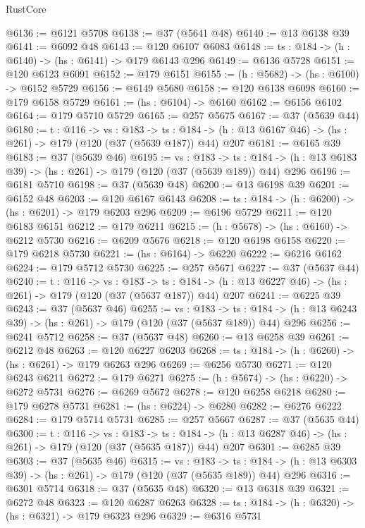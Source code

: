 \begin{lexlean}{RustCore}
\begin{coremodule}
@6136 := @6121 @5708
@6138 := @37 (@5641 @48)
@6140 := @13 @6138 @39
@6141 := @6092 @48
@6143 := @120 @6107 @6083
@6148 := {ts : @184} -> (h : @6140) -> (hs : @6141) -> @179 @6143 @296
@6149 := @6136 @5728
@6151 := @120 @6123 @6091
@6152 := @179 @6151
@6155 := (h : @5682) -> (hs : @6100) -> @6152 @5729
@6156 := @6149 @5680
@6158 := @120 @6138 @6098
@6160 := @179 @6158 @5729
@6161 := (hs : @6104) -> @6160
@6162 := @6156 @6102
@6164 := @179 @5710 @5729
@6165 := @257 @5675
@6167 := @37 (@5639 @44)
@6180 := {t : @116} ->
  {vs : @183} ->
  {ts : @184} -> (h : @13 @6167 @46) -> (hs : @261) -> @179 (@120 (@37 (@5639 @187)) @44) @207
@6181 := @6165 @39
@6183 := @37 (@5639 @46)
@6195 := {vs : @183} ->
  {ts : @184} -> (h : @13 @6183 @39) -> (hs : @261) -> @179 (@120 (@37 (@5639 @189)) @44) @296
@6196 := @6181 @5710
@6198 := @37 (@5639 @48)
@6200 := @13 @6198 @39
@6201 := @6152 @48
@6203 := @120 @6167 @6143
@6208 := {ts : @184} -> (h : @6200) -> (hs : @6201) -> @179 @6203 @296
@6209 := @6196 @5729
@6211 := @120 @6183 @6151
@6212 := @179 @6211
@6215 := (h : @5678) -> (hs : @6160) -> @6212 @5730
@6216 := @6209 @5676
@6218 := @120 @6198 @6158
@6220 := @179 @6218 @5730
@6221 := (hs : @6164) -> @6220
@6222 := @6216 @6162
@6224 := @179 @5712 @5730
@6225 := @257 @5671
@6227 := @37 (@5637 @44)
@6240 := {t : @116} ->
  {vs : @183} ->
  {ts : @184} -> (h : @13 @6227 @46) -> (hs : @261) -> @179 (@120 (@37 (@5637 @187)) @44) @207
@6241 := @6225 @39
@6243 := @37 (@5637 @46)
@6255 := {vs : @183} ->
  {ts : @184} -> (h : @13 @6243 @39) -> (hs : @261) -> @179 (@120 (@37 (@5637 @189)) @44) @296
@6256 := @6241 @5712
@6258 := @37 (@5637 @48)
@6260 := @13 @6258 @39
@6261 := @6212 @48
@6263 := @120 @6227 @6203
@6268 := {ts : @184} -> (h : @6260) -> (hs : @6261) -> @179 @6263 @296
@6269 := @6256 @5730
@6271 := @120 @6243 @6211
@6272 := @179 @6271
@6275 := (h : @5674) -> (hs : @6220) -> @6272 @5731
@6276 := @6269 @5672
@6278 := @120 @6258 @6218
@6280 := @179 @6278 @5731
@6281 := (hs : @6224) -> @6280
@6282 := @6276 @6222
@6284 := @179 @5714 @5731
@6285 := @257 @5667
@6287 := @37 (@5635 @44)
@6300 := {t : @116} ->
  {vs : @183} ->
  {ts : @184} -> (h : @13 @6287 @46) -> (hs : @261) -> @179 (@120 (@37 (@5635 @187)) @44) @207
@6301 := @6285 @39
@6303 := @37 (@5635 @46)
@6315 := {vs : @183} ->
  {ts : @184} -> (h : @13 @6303 @39) -> (hs : @261) -> @179 (@120 (@37 (@5635 @189)) @44) @296
@6316 := @6301 @5714
@6318 := @37 (@5635 @48)
@6320 := @13 @6318 @39
@6321 := @6272 @48
@6323 := @120 @6287 @6263
@6328 := {ts : @184} -> (h : @6320) -> (hs : @6321) -> @179 @6323 @296
@6329 := @6316 @5731

\end{coremodule}
\end{lexlean}
